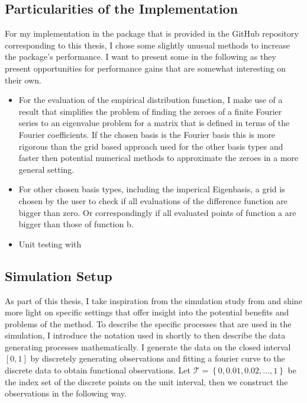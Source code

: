 \documentclass[12pt, a4paper]{article}
\theoremstyle{MAstyle} \newtheorem{assumption}{Assumption}[section]
\theoremstyle{MAstyle} \newtheorem{definition}{Definition}[section]
\begin{document}
		\subsection{Particularities of the Implementation}
			For my implementation in the package that is provided in the GitHub repository corresponding to this thesis, I chose some slightly unusual methods to increase the package's performance. I want to present some in the following as they present opportunities for performance gains that are somewhat interesting on their own.
			\begin{itemize}
				\item For the evaluation of the empirical distribution function, I make use of a result \cite{boyd_computing_2006} that simplifies the problem of finding the zeroes of a finite Fourier series to an eigenvalue problem for a matrix that is defined in terms of the Fourier coefficients. If the chosen basis is the Fourier basis this is more rigorous than the grid based approach used for the other basis types and faster then potential numerical methods to approximate the zeroes in a more general setting.
				\item For other chosen basis types, including the imperical Eigenbasis, a grid is chosen by the user to check if all evaluations of the difference function are bigger than zero. Or correspondingly if all evaluated points of function a are bigger than those of function b.
				\item Unit testing with \cite{testthat}
			\end{itemize}

		\subsection{Simulation Setup}
		As part of this thesis, I take inspiration from the simulation study from \cite{bugni_permutation_2021} and shine more light on specific settings that offer insight into the potential benefits and problems of the method. To describe the specific processes that are used in the simulation, I introduce the notation used in \cite{bugni_permutation_2021} shortly to then describe the data generating processes mathematically. I generate the data on the closed interval $\left[0,1\right]$ by discretely generating observations and fitting a fourier curve to the discrete data to obtain functional observations. Let $\mathcal{T} = \left\{0, 0.01, 0.02, \dots, 1\right\}$ be the index set of the discrete points on the unit interval, then we construct the observations in the following way.
		
\end{document}
